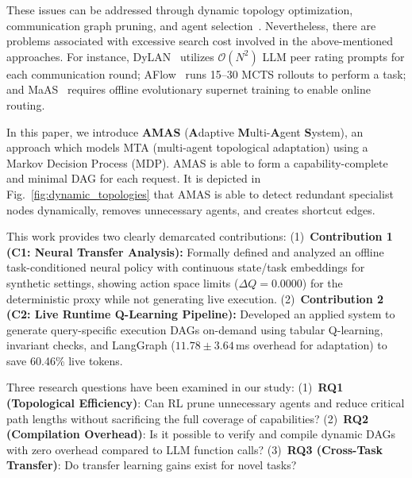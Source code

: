 ﻿\documentclass[conference]{IEEEtran}
\begin{document}
These issues can be addressed through dynamic topology optimization, communication graph pruning, and agent selection~\cite{liu2024dylan,zhuge2024gptswarm,zhang2024aflow,Zhang2025MaAS,Li2025AdaptiveGraphPruning,xiao2026agentdropout,zhang2025gdesigner}. Nevertheless, there are problems associated with excessive search cost involved in the above-mentioned approaches. For instance, DyLAN~\cite{liu2024dylan} utilizes $\mathcal{O}(N^2)$ LLM peer rating prompts for each communication round; AFlow~\cite{zhang2024aflow} runs 15–30 MCTS rollouts to perform a task; and MaAS~\cite{Zhang2025MaAS} requires offline evolutionary supernet training to enable online routing.

In this paper, we introduce \textbf{AMAS} (\textbf{A}daptive \textbf{M}ulti-\textbf{A}gent \textbf{S}ystem), an approach which models MTA (multi-agent topological adaptation) using a Markov Decision Process (MDP). AMAS is able to form a capability-complete and minimal DAG for each request. It is depicted in Fig.~\ref{fig:dynamic_topologies} that AMAS is able to detect redundant specialist nodes dynamically, removes unnecessary agents, and creates shortcut edges.

This work provides two clearly demarcated contributions:
(1)~\textbf{Contribution 1 (C1: Neural Transfer Analysis):} Formally defined and analyzed an offline task-conditioned neural policy with continuous state/task embeddings for synthetic settings, showing action space limits ($\Delta Q = 0.0000$) for the deterministic proxy while not generating live execution.
(2)~\textbf{Contribution 2 (C2: Live Runtime Q-Learning Pipeline):} Developed an applied system to generate query-specific execution DAGs on-demand using tabular Q-learning, invariant checks, and LangGraph ($11.78 \pm 3.64$\,ms overhead for adaptation) to save 60.46\% live tokens.

Three research questions have been examined in our study: (1)~\textbf{RQ1 (Topological Efficiency)}: Can RL prune unnecessary agents and reduce critical path lengths without sacrificing the full coverage of capabilities? (2)~\textbf{RQ2 (Compilation Overhead)}: Is it possible to verify and compile dynamic DAGs with zero overhead compared to LLM function calls? (3)~\textbf{RQ3 (Cross-Task Transfer)}: Do transfer learning gains exist for novel tasks?
\end{document}
